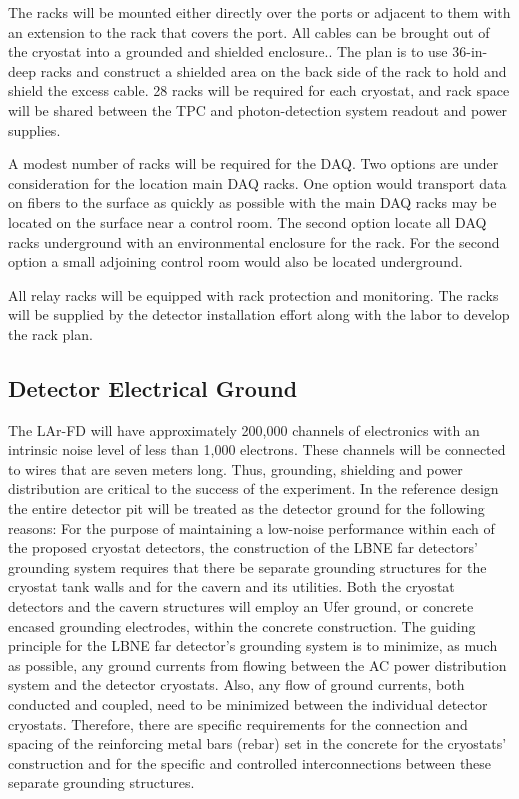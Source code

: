 The racks will be mounted either directly over the ports or adjacent to them with an extension to the rack that covers the port. All cables can be brought out of the cryostat into a grounded and shielded 
enclosure.. The plan is to use 36-in-deep racks and construct a shielded area on the back side of the rack to hold and shield the excess cable. 28 racks will be required for each cryostat, and rack space will be shared between the TPC and photon-detection system readout and power supplies. 

A modest number of racks will be required for the DAQ. Two options are under consideration for the location main DAQ racks. One option would transport data on fibers to the surface as quickly as possible 
with the main DAQ racks may be located on the surface near a control room. The second option locate all DAQ racks underground with an environmental enclosure for the rack. For the second option a small adjoining control room would also be located underground.

All relay racks will be equipped with rack protection and monitoring. The racks will be supplied by the 
detector installation effort along with the labor to develop the rack plan.

\subsection{Detector Electrical Ground} 
\label{fd:install:integ:elecgnd}

The LAr-FD will have approximately 200,000 channels of electronics with an intrinsic noise level of less than 1,000 electrons. These channels will be connected to wires that are seven meters long. Thus, 
grounding, shielding and power distribution are critical to the success of the experiment. In the reference design the entire detector pit will be treated as the detector ground for the following reasons: 
For the purpose of maintaining a low-noise performance within each of the proposed cryostat detectors, the construction of the LBNE far detectors’ grounding system requires that there be separate grounding 
structures for the cryostat tank walls and for the cavern and its utilities. Both the cryostat detectors and the cavern structures will employ an Ufer ground, or concrete encased grounding electrodes, within the concrete construction. The guiding principle for the LBNE far detector's grounding system is to minimize, 
as much as possible, any ground currents from flowing between the AC power distribution system and the detector cryostats. Also, any flow of ground currents, both conducted and coupled, need to be 
minimized between the individual detector cryostats. Therefore, there are specific requirements for the connection and spacing of the reinforcing metal bars (rebar) set in the concrete for the cryostats' 
construction and for the specific and controlled interconnections between these separate grounding structures.

